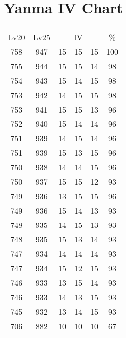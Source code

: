 \documentclass{article}%
\begin{document}
%
\normalsize%
\section{Yanma IV Chart}%
\label{sec:Yanma IV Chart}%
\renewcommand{\arraystretch}{1.5}%
\begin{tabular}{|c|c|c|c|c|c|}%
\hline%
\multicolumn{6}{|c|}{\textcolor{white}{ 
\linebreak{Yanma}
}%
\cellcolor{black}}\\%
\multicolumn{1}{|c}{Lv20}&\multicolumn{1}{c|}{Lv25}&\multicolumn{3}{c|}{IV}&\multicolumn{1}{|c|}{\%}\\%
\hline%
\rowcolor{color100}%
758&947&15&15&15&100\\%
\hline%
\rowcolor{color98}%
755&944&15&15&14&98\\%
\hline%
\rowcolor{color98}%
754&943&15&14&15&98\\%
\hline%
\rowcolor{color98}%
753&942&14&15&15&98\\%
\hline%
\rowcolor{color96}%
753&941&15&15&13&96\\%
\hline%
\rowcolor{color96}%
752&940&15&14&14&96\\%
\hline%
\rowcolor{color96}%
751&939&14&15&14&96\\%
\hline%
\rowcolor{color96}%
751&939&15&13&15&96\\%
\hline%
\rowcolor{color96}%
750&938&14&14&15&96\\%
\hline%
\rowcolor{color93}%
750&937&15&15&12&93\\%
\hline%
\rowcolor{color96}%
749&936&13&15&15&96\\%
\hline%
\rowcolor{color93}%
749&936&15&14&13&93\\%
\hline%
\rowcolor{color93}%
748&935&14&15&13&93\\%
\hline%
\rowcolor{color93}%
748&935&15&13&14&93\\%
\hline%
\rowcolor{color93}%
747&934&14&14&14&93\\%
\hline%
\rowcolor{color93}%
747&934&15&12&15&93\\%
\hline%
\rowcolor{color93}%
746&933&13&15&14&93\\%
\hline%
\rowcolor{color93}%
746&933&14&13&15&93\\%
\hline%
\rowcolor{color93}%
745&932&13&14&15&93\\%
\hline%
\rowcolor{color91}%
706&882&10&10&10&67\\%
\end{tabular}

%
\end{document}
